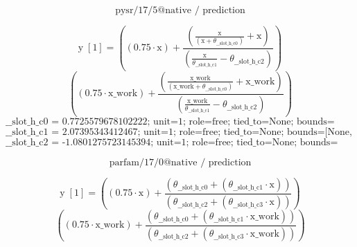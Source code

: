 \[\text{pysr/17/5@native / prediction}\]
\noindent {}\par
\[\text{y}\;[\text{1}] = \left(\left(0.75 \cdot \text{x}\right) + \frac{\left(\frac{\text{x}}{\left(\text{x} + \theta_{\text{\_\_slot\_h\_c0}}\right)} + \text{x}\right)}{\left(\frac{\text{x}}{\theta_{\text{\_\_slot\_h\_c1}}} - \theta_{\text{\_\_slot\_h\_c2}}\right)}\right)\]
\[\left(\left(0.75 \cdot \text{x\_work}\right) + \frac{\left(\frac{\text{x\_work}}{\left(\text{x\_work} + \theta_{\text{\_\_slot\_h\_c0}}\right)} + \text{x\_work}\right)}{\left(\frac{\text{x\_work}}{\theta_{\text{\_\_slot\_h\_c1}}} - \theta_{\text{\_\_slot\_h\_c2}}\right)}\right)\]
\[\text{\_\_slot\_h\_c0 = 0.7725579678102222; unit=1; role=free; tied\_to=None; bounds=[None, None]; origin=pysr\_native\_template\_constant\_node}\]
\[\text{\_\_slot\_h\_c1 = 2.07395343412467; unit=1; role=free; tied\_to=None; bounds=[None, None]; origin=pysr\_native\_template\_constant\_node}\]
\[\text{\_\_slot\_h\_c2 = -1.0801275723145394; unit=1; role=free; tied\_to=None; bounds=[None, None]; origin=pysr\_native\_template\_constant\_node}\]
\noindent {}\par
\noindent {}\par
\noindent {}\par
\noindent {}\par
\[\text{parfam/17/0@native / prediction}\]
\noindent {}\par
\[\text{y}\;[\text{1}] = \left(\left(0.75 \cdot \text{x}\right) + \frac{\left(\theta_{\text{\_\_slot\_h\_c0}} + \left(\theta_{\text{\_\_slot\_h\_c1}} \cdot \text{x}\right)\right)}{\left(\theta_{\text{\_\_slot\_h\_c2}} + \left(\theta_{\text{\_\_slot\_h\_c3}} \cdot \text{x}\right)\right)}\right)\]
\[\left(\left(0.75 \cdot \text{x\_work}\right) + \frac{\left(\theta_{\text{\_\_slot\_h\_c0}} + \left(\theta_{\text{\_\_slot\_h\_c1}} \cdot \text{x\_work}\right)\right)}{\left(\theta_{\text{\_\_slot\_h\_c2}} + \left(\theta_{\text{\_\_slot\_h\_c3}} \cdot \text{x\_work}\right)\right)}\right)\]
